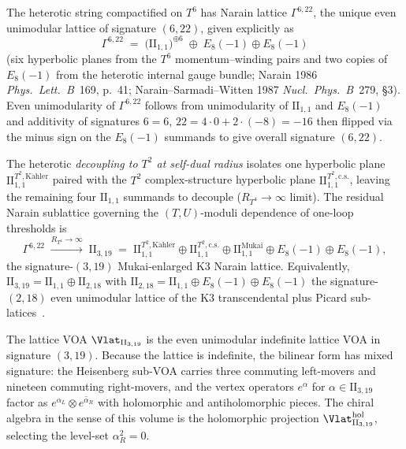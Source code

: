 \begin{example}\label{ex:lattice:narain-heterotic-T6}
%
%
%
The heterotic string compactified on $T^6$ has Narain lattice
$\Gamma^{6,22}$, the unique even unimodular lattice of signature
$(6,22)$, given explicitly as
\begin{equation}\label{eq:lattice:narain-heterotic-decomp}
\Gamma^{6,22}
\;=\;
\bigl(\mathrm{II}_{1,1}\bigr)^{\oplus 6}
\;\oplus\;
E_8(-1)\oplus E_8(-1)
\end{equation}
(six hyperbolic planes from the $T^6$ momentum--winding pairs and two
copies of $E_8(-1)$ from the heterotic internal gauge bundle;
Narain 1986 \emph{Phys.~Lett.~B}~169, p.~41;
Narain--Sarmadi--Witten 1987 \emph{Nucl.~Phys.~B}~279, \S 3).
Even unimodularity of $\Gamma^{6,22}$ follows from unimodularity of
$\mathrm{II}_{1,1}$ and $E_8(-1)$ and additivity of signatures
$6 = 6$, $22 = 4\cdot 0 + 2\cdot(-8) = -16$ then flipped via the minus
sign on the $E_8(-1)$ summands to give overall signature $(6,22)$.

The heterotic \emph{decoupling to $T^2$ at self-dual radius} isolates
one hyperbolic plane $\mathrm{II}_{1,1}^{T^2,\mathrm{K\ddot ahler}}$
paired with the $T^2$ complex-structure hyperbolic plane
$\mathrm{II}_{1,1}^{T^2,\mathrm{c.s.}}$, leaving the remaining
four $\mathrm{II}_{1,1}$ summands to decouple ($R_{T^4}\to\infty$
limit). The residual Narain sublattice governing the $(T, U)$-moduli
dependence of one-loop thresholds is
\begin{equation}\label{eq:lattice:narain-decoupling}
\Gamma^{6,22}
\;\xrightarrow{R_{T^4}\to\infty}\;
\mathrm{II}_{3,19}
\;=\;
\mathrm{II}_{1,1}^{T^2,\mathrm{K\ddot ahler}}
\oplus
\mathrm{II}_{1,1}^{T^2,\mathrm{c.s.}}
\oplus
\mathrm{II}_{1,1}^{\mathrm{Mukai}}
\oplus
E_8(-1)\oplus E_8(-1),
\end{equation}
the signature-$(3,19)$ Mukai-enlarged K3 Narain lattice. Equivalently,
$\mathrm{II}_{3,19} = \mathrm{II}_{1,1}\oplus \mathrm{II}_{2,18}$
with $\mathrm{II}_{2,18} = \mathrm{II}_{1,1}\oplus E_8(-1)\oplus E_8(-1)$
the signature-$(2,18)$ even unimodular lattice of the K3 transcendental
plus Picard sub-latices~\cite{NahmWendland2001,HarveyMoore1996}.

The lattice VOA $\Vlat_{\mathrm{II}_{3,19}}$ is the even unimodular
indefinite lattice VOA in signature $(3,19)$. Because the lattice is
indefinite, the bilinear form has mixed signature: the Heisenberg
sub-VOA carries three commuting left-movers and nineteen commuting
right-movers, and the vertex operators $e^\alpha$ for $\alpha\in
\mathrm{II}_{3,19}$ factor as $e^{\alpha_L}\otimes\overline{e^{\alpha_R}}$
with holomorphic and antiholomorphic pieces. The chiral algebra in the
sense of this volume is the holomorphic projection
$\Vlat^{\mathrm{hol}}_{\mathrm{II}_{3,19}}$, selecting the level-set
$\alpha_R^2 = 0$.


\end{example}
